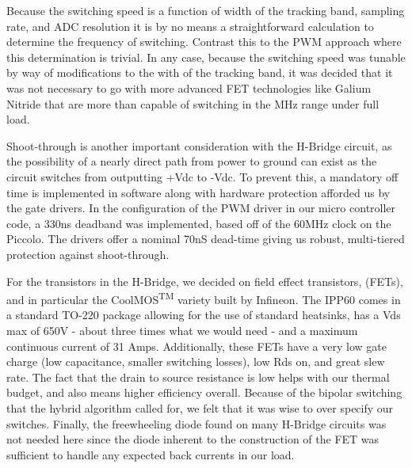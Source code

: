 Because the switching speed is a function of width of the tracking band, sampling rate, and ADC resolution it is by no means a straightforward calculation to determine the frequency of switching. Contrast this to the PWM approach where this determination is trivial. In any case, because the switching speed was tunable by way of modifications to the with of the tracking band, it was decided that it was not necessary to go with more advanced FET technologies like Galium Nitride that are more than capable of switching in the MHz range under full load. 

Shoot-through is another important consideration with the H-Bridge circuit, as the possibility of a nearly direct path from power to ground can exist as the circuit switches from outputting +Vdc to -Vdc. To prevent this, a mandatory off time is implemented in software along with  hardware protection afforded us by the gate drivers. In the configuration of the PWM driver in our micro controller code, a 330ns deadband was implemented, based off of the 60MHz clock on the Piccolo. The drivers offer a nominal 70nS dead-time giving us robust, multi-tiered protection against shoot-through. 

For the transistors in the H-Bridge, we decided on field effect transistors, (FETs), and in particular the CoolMOS\textsuperscript{TM}
variety built by Infineon. The IPP60 comes in a standard TO-220 package allowing for the use of standard heatsinks, has a Vds max of 650V - about three times what we would need - and a maximum continuous current of 31 Amps. Additionally, these FETs have a very low gate charge (low capacitance, smaller switching losses), low Rds on, and great slew rate. The fact that the drain to source resistance is low helps with our thermal budget, and also means higher efficiency overall. Because of the bipolar switching that the hybrid algorithm called for, we felt that it was wise to over specify our switches. Finally, the freewheeling diode found on many H-Bridge circuits was not needed here since the diode inherent to the construction of the FET was sufficient to handle any expected back currents in our load. 

